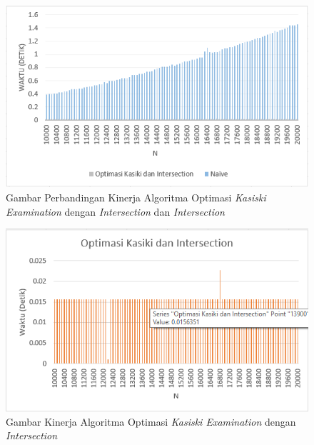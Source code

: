 	\begin{figure}[H]
	\centering
  	\includegraphics[scale=0.7]{images/bab5/ACD.png}
  	\caption{Gambar Perbandingan Kinerja Algoritma Optimasi \textit{Kasiski Examination} dengan \textit{Intersection} dan \textit{Intersection}}
  	\label{fig:banding12}
	\end{figure}
	
	\begin{figure}[H]
	\centering
  	\includegraphics[scale=0.7]{images/bab5/b.png}
  	\caption{Gambar Kinerja Algoritma Optimasi \textit{Kasiski Examination} dengan \textit{Intersection}}
  	\label{fig:banding}
	\end{figure}
	
